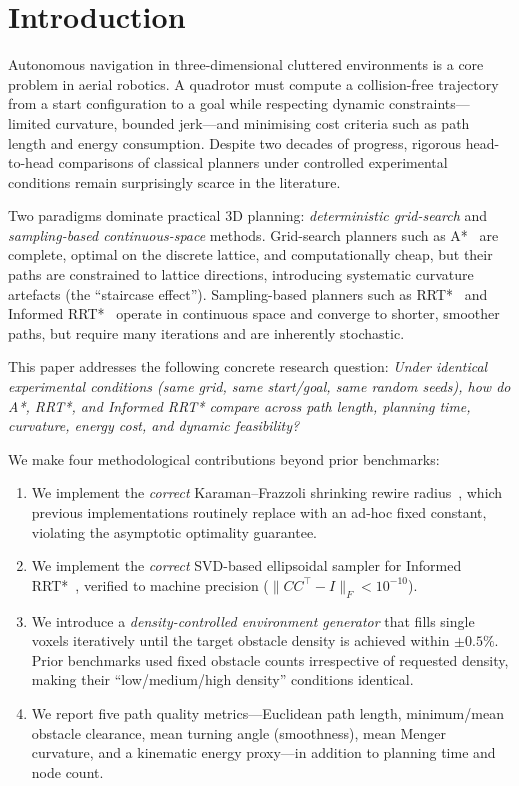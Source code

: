 \documentclass[10pt,twocolumn]{article}
\begin{document}
\section{Introduction}\label{sec:intro}

Autonomous navigation in three-dimensional cluttered environments is a
core problem in aerial robotics.
A quadrotor must compute a collision-free trajectory from a start
configuration to a goal while respecting dynamic constraints---limited
curvature, bounded jerk---and minimising cost criteria such as path
length and energy consumption.
Despite two decades of progress, rigorous head-to-head comparisons of
classical planners under controlled experimental conditions remain
surprisingly scarce in the literature.

Two paradigms dominate practical 3D planning: \emph{deterministic
grid-search} and \emph{sampling-based continuous-space} methods.
Grid-search planners such as A*~\cite{hart1968} are complete, optimal on
the discrete lattice, and computationally cheap, but their paths are
constrained to lattice directions, introducing systematic curvature
artefacts (the ``staircase effect'').
Sampling-based planners such as RRT*~\cite{karaman2011} and Informed
RRT*~\cite{gammell2014} operate in continuous space and converge to
shorter, smoother paths, but require many iterations and are inherently
stochastic.

This paper addresses the following concrete research question:
\emph{Under identical experimental conditions (same grid, same
start/goal, same random seeds), how do A*, RRT*, and Informed RRT*
compare across path length, planning time, curvature, energy cost, and
dynamic feasibility?}

We make four methodological contributions beyond prior benchmarks:

\begin{enumerate}
\item We implement the \emph{correct} Karaman--Frazzoli shrinking rewire
  radius~\cite{karaman2011}, which previous implementations routinely
  replace with an ad-hoc fixed constant, violating the asymptotic
  optimality guarantee.

\item We implement the \emph{correct} SVD-based ellipsoidal sampler for
  Informed RRT*~\cite{gammell2014}, verified to machine precision
  ($\|CC^\top - I\|_F < 10^{-10}$).

\item We introduce a \emph{density-controlled environment generator}
  that fills single voxels iteratively until the target obstacle density
  is achieved within $\pm0.5\%$.
  Prior benchmarks used fixed obstacle counts irrespective of requested
  density, making their ``low/medium/high density'' conditions identical.

\item We report five path quality metrics---Euclidean path length,
  minimum/mean obstacle clearance, mean turning angle (smoothness),
  mean Menger curvature, and a kinematic energy proxy---in addition to
  planning time and node count.
\end{enumerate}
\end{document}
